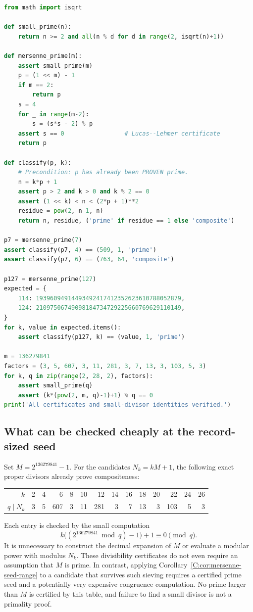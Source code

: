 \documentclass[11pt,a4paper]{article}
\theoremstyle{definition}
\theoremstyle{remark}
\numberwithin{equation}{section}
\begin{document}
\begingroup\small
\begin{lstlisting}[language=Python]
from math import isqrt

def small_prime(n):
    return n >= 2 and all(n % d for d in range(2, isqrt(n)+1))

def mersenne_prime(m):
    assert small_prime(m)
    p = (1 << m) - 1
    if m == 2:
        return p
    s = 4
    for _ in range(m-2):
        s = (s*s - 2) % p
    assert s == 0                 # Lucas--Lehmer certificate
    return p

def classify(p, k):
    # Precondition: p has already been PROVEN prime.
    n = k*p + 1
    assert p > 2 and k > 0 and k % 2 == 0
    assert (1 << k) < n < (2*p + 1)**2
    residue = pow(2, n-1, n)
    return n, residue, ('prime' if residue == 1 else 'composite')

p7 = mersenne_prime(7)
assert classify(p7, 4) == (509, 1, 'prime')
assert classify(p7, 6) == (763, 64, 'composite')

p127 = mersenne_prime(127)
expected = {
    114: 19396094914493492417412352623610788052879,
    124: 21097506749098184734729225660769629110149,
}
for k, value in expected.items():
    assert classify(p127, k) == (value, 1, 'prime')

m = 136279841
factors = (3, 5, 607, 3, 11, 281, 3, 7, 13, 3, 103, 5, 3)
for k, q in zip(range(2, 28, 2), factors):
    assert small_prime(q)
    assert (k*(pow(2, m, q)-1)+1) % q == 0
print('All certificates and small-divisor identities verified.')
\end{lstlisting}
\endgroup

\subsection{What can be checked cheaply at the record-sized seed}

Set $M=2^{136279841}-1$. For the candidates $N_k=kM+1$, the
following exact proper divisors already prove compositeness:
\begin{center}
\small
\begin{tabular}{@{}r*{13}{r}@{}}
\toprule
$k$ & 2&4&6&8&10&12&14&16&18&20&22&24&26\\
$q\mid N_k$ &3&5&607&3&11&281&3&7&13&3&103&5&3\\
\bottomrule
\end{tabular}
\end{center}
Each entry is checked by the small computation
\[
 k\bigl((2^{136279841}\bmod q)-1\bigr)+1\equiv0\pmod q.
\]
It is unnecessary to construct the decimal expansion of $M$ or
evaluate a modular power with modulus $N_k$. These divisibility
certificates do not even require an assumption that $M$ is prime.
In contrast, applying Corollary~\ref{C:cor:mersenne-seed-range} to a
candidate that survives such sieving requires a certified prime seed
and a potentially very expensive congruence computation. No prime
larger than $M$ is certified by this table, and failure to find a small
divisor is not a primality proof.
\end{document}
